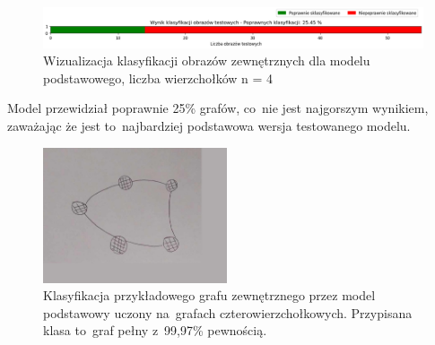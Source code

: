 \begin{figure}[ht]
	\centering
	\includegraphics[width=15.5cm]{resources/tests/images/v3/base4_bar.png}
	\caption{Wizualizacja klasyfikacji obrazów zewnętrznych dla modelu podstawowego, liczba wierzchołków n = 4}
	\label{Fig:tests-base-1c}
\end{figure}
\FloatBarrier

Model przewidział poprawnie 25\% grafów, co~nie jest najgorszym wynikiem,
zaważając że jest to~najbardziej podstawowa wersja testowanego modelu.

\begin{figure}[ht]
	\centering
	\includegraphics[height=4cm]{../graph_classification/test_graphs/drawn/cycle-1.png}
	\caption{Klasyfikacja przykładowego grafu zewnętrznego przez model podstawowy uczony na~grafach czterowierzchołkowych.
		Przypisana klasa to~graf pełny z~99,97\% pewnością.}
	\label{Fig:tests-base-1d}
\end{figure}
\FloatBarrier




